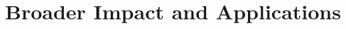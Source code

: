\documentclass[12pt]{article}
\numberwithin{equation}{section}
\theoremstyle{definition}
\theoremstyle{remark}
\newcommand{\1}{\mathbf 1}
\newcommand{\<}{\langle}
\renewcommand{\>}{\rangle}
\begin{document}



 


\section{Broader Impact and Applications}
\end{document}

